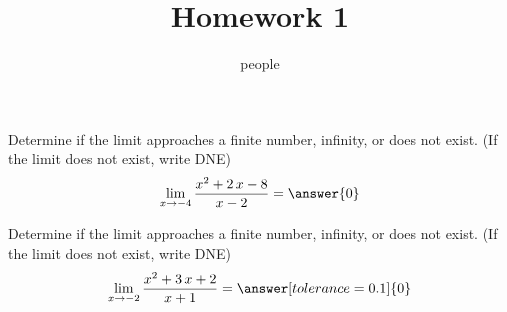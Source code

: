 \documentclass[handout]{ximera}
\title{Homework 1}
\author{people}
\begin{document}
\maketitle

\begin{shuffle}

\begin{problem}
  \fi

Determine if the limit approaches a finite number, infinity, or does not exist. (If the limit does not exist, write DNE)
\[\lim_{x\to{{-4}}}\dfrac{{{x^{2} + 2 \, x - 8}}}{{{x - 2}}}=\answer{0}\]
\end{problem}%




\begin{problem}
Determine if the limit approaches a finite number, infinity, or does not exist. (If the limit does not exist, write DNE)
\[\lim_{x\to{{-2}}}\dfrac{{{x^{2} + 3 \, x + 2}}}{{{x + 1}}}=\answer[tolerance=0.1]{0}\]
\end{problem}%


\end{shuffle}
\end{document}
